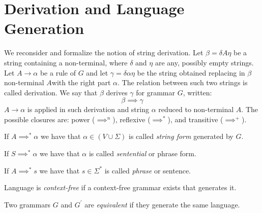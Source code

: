 \section{Derivation and Language Generation}

We reconsider and formalize the notion of string derivation. Let $\beta=\delta A \eta$ be a string containing a non-terminal, where $\delta$ and $\eta$ are any, 
possibly empty strings. Let $A \rightarrow \alpha$ be a rule of $G$ and let $\gamma=\delta\alpha\eta$ be the string obtained replacing in $\beta$ non-terminal $A$with 
the right part $\alpha$. The relation between such two strings is called derivation. We say that $\beta$ derives $\gamma$ for grammar $G$, written:
\[\beta \implies \gamma\]
$A\rightarrow \alpha$ is applied in such derivation and string $\alpha$ reduced to non-terminal $A$. The possible closures are: power ($\implies^n$), 
reflexive ($\implies^{*}$), and transitive ($\implies^{+}$). 
\begin{definition}
    If $A \implies^{*} \alpha$ we have that $\alpha \in (V \cup \Sigma)$ is called \emph{string form} generated by $G$. 

    If $S \implies^{*} \alpha$ we have that $\alpha$ is called \emph{sentential} or phrase form.

    If $A \implies^{*} s$ we have that $s \in \Sigma^{*}$ is called \emph{phrase} or sentence. 

    Language is \emph{context-free} if a context-free grammar exists that generates it. 
    
    Two grammars $G$ and $G^{'}$ are \emph{equivalent} if they generate the same language. 
\end{definition}